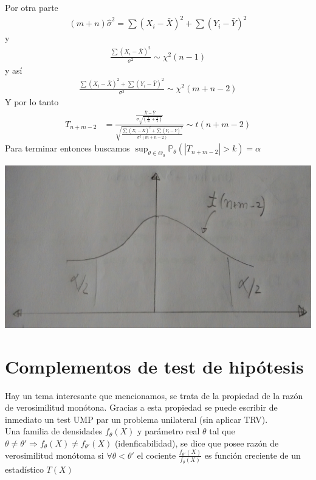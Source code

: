 \documentclass[10pt]{article}
\theoremstyle{plain}
\theoremstyle{definition}
\begin{document}
Por otra parte
\begin{align*}
(m+n)\hat{\sigma}^2 = \sum (X_{i}-\bar{X})^2 + \sum (Y_{i}-\bar{Y})^2
\end{align*}
y
\begin{align*}
\frac{\sum (X_{i}-\bar{X})^2}{\sigma^2} \sim \chi^2(n-1)
\end{align*}
y así
\begin{align*}
\frac{\sum (X_{i}-\bar{X})^2+\sum (Y_{i}-\bar{Y})^2}{\sigma^2} \sim \chi^2(m+n-2)
\end{align*}
Y por lo tanto
\begin{align*}
T_{n+m-2} &= \frac{\frac{\bar{X}-\bar{Y}}{\sigma\sqrt{\left(\frac{1}{m}+\frac{1}{n}\right)}}}{\sqrt{\frac{\sum (X_{i}-\bar{X})^2+\sum (Y_{i}-\bar{Y})^2}{\sigma^2(m+n-2)}}} \sim t(n+m-2)
\end{align*}
Para terminar entonces buscamos $\sup_{\theta\in\Theta_{0}}\mathbb{P}_{\theta}(|T_{n+m-2}|>k) = \alpha$
\begin{center}
\includegraphics[scale=0.1]{imagenes/student.jpg}
\end{center}
\section{Complementos de test de hipótesis}
Hay un tema interesante que mencionamos, se trata de la propiedad de la razón de verosimilitud monótona. Gracias a esta propiedad se puede escribir de inmediato un test UMP par un problema unilateral (sin aplicar TRV).\\

Una familia de densidades $f_{\theta}(X)$ y parámetro real $\theta$ tal que $\theta \not = \theta' \Rightarrow f_{\theta}(X) \not = f_{\theta'}(X)$ (idenficabilidad), se dice que posee razón de verosimilitud monótoma si $\forall \theta < \theta'$ el cociente $\frac{f_{\theta'}(X)}{f_{\theta}(X)}$ es función creciente de un estadístico $T(X)$
\end{document}
